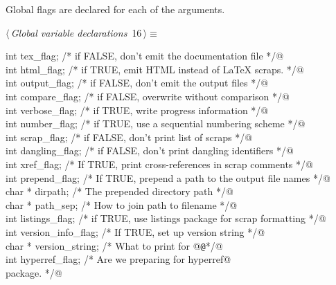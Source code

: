 \documentclass[a4paper]{report}
\begin{document}
\noindent
Global flags are declared for each of the arguments.
\begin{flushleft} \small
\begin{minipage}{\linewidth}\label{scrap17}\raggedright\small
{} $\langle\,${\it Global variable declarations}\nobreak\ {\footnotesize {16}}$\,\rangle\equiv$
\vspace{-1ex}
\begin{list}{}{} \item
\mbox{}\verb@extern int tex_flag;      /* if FALSE, don't emit the documentation file */@\\
\mbox{}\verb@extern int html_flag;     /* if TRUE, emit HTML instead of LaTeX scraps. */@\\
\mbox{}\verb@extern int output_flag;   /* if FALSE, don't emit the output files */@\\
\mbox{}\verb@extern int compare_flag;  /* if FALSE, overwrite without comparison */@\\
\mbox{}\verb@extern int verbose_flag;  /* if TRUE, write progress information */@\\
\mbox{}\verb@extern int number_flag;   /* if TRUE, use a sequential numbering scheme */@\\
\mbox{}\verb@extern int scrap_flag;    /* if FALSE, don't print list of scraps */@\\
\mbox{}\verb@extern int dangling_flag;    /* if FALSE, don't print dangling identifiers */@\\
\mbox{}\verb@extern int xref_flag; /* If TRUE, print cross-references in scrap comments */@\\
\mbox{}\verb@extern int prepend_flag;  /* If TRUE, prepend a path to the output file names */@\\
\mbox{}\verb@extern char * dirpath;    /* The prepended directory path */@\\
\mbox{}\verb@extern char * path_sep;   /* How to join path to filename */@\\
\mbox{}\verb@extern int listings_flag;   /* if TRUE, use listings package for scrap formatting */@\\
\mbox{}\verb@extern int version_info_flag; /* If TRUE, set up version string */@\\
\mbox{}\verb@extern char *  version_string; /* What to print for @{\tt @}\verb@v */@\\
\mbox{}\verb@extern int hyperref_flag; /* Are we preparing for hyperref@\\
\mbox{}\verb@                             package. */@\\

\end{list}
\end{minipage}
\end{flushleft}
\end{document}
